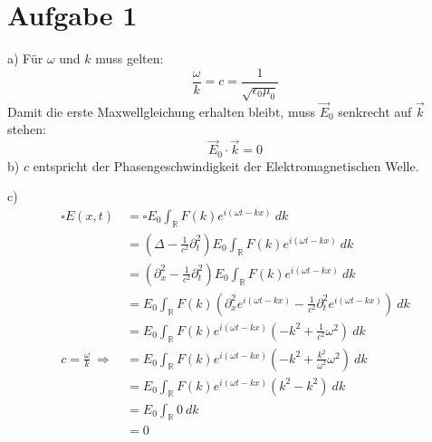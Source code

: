 \documentclass[11pt a4paper]{article}
\newcommand{\delt}{\partial_t}
\newcommand{\epsz}{\epsilon_0}
\newcommand{\del}{\partial}
\begin{document}
\thispagestyle{fancy}

\section*{Aufgabe 1}
a) Für $\omega$ und $k$ muss gelten:
\[ \frac{\omega}{k} = c = \frac{1}{\sqrt{\epsz\mu_0}} \]
Damit die erste Maxwellgleichung erhalten bleibt, muss $\vec E_0$ senkrecht auf $\vec k$ stehen:
\[ \vec E_0 \cdot \vec k = 0 \]
b) $c$ entspricht der Phasengeschwindigkeit der Elektromagnetischen Welle.

\vspace{0.5cm}
\noindent
c) 
\begin{align*}
	\square E(x,t)
	&= \square E_0 \int_{\mathbb R} F(k) e^{i(\omega t - kx)} \ dk \\
	&= \left(\Delta - \frac{1}{c^2} \delt^2 \right) E_0 \int_{\mathbb R} F(k) e^{i(\omega t - kx)} \ dk \\
	&= \left(\del_x^2 - \frac{1}{c^2} \delt^2 \right) E_0 \int_{\mathbb R} F(k) e^{i(\omega t - kx)} \ dk \\
	&= E_0 \int_{\mathbb R} F(k) \left( 
		\del_x^2 e^{i(\omega t - kx)} - \frac{1}{c^2} \delt^2 e^{i(\omega t - kx)} \right) \ dk \\
	&= E_0 \int_{\mathbb R} F(k) e^{i(\omega t - kx)} \left( 
		-k^2 + \frac{1}{c^2} \omega^2 \right) \ dk \\
	c = \frac{\omega}{k} \ \Rightarrow \
	&= E_0 \int_{\mathbb R} F(k) e^{i(\omega t - kx)} \left( 
		-k^2 + \frac{k^2}{\omega^2} \omega^2 \right) \ dk \\
	&= E_0 \int_{\mathbb R} F(k) e^{i(\omega t - kx)} (k^2 - k^2) \ dk \\
	&= E_0 \int_{\mathbb R} 0 \ dk \\
	&= 0
\end{align*}

\newpage
\setlength{\headheight}{0cm}
\end{document}

